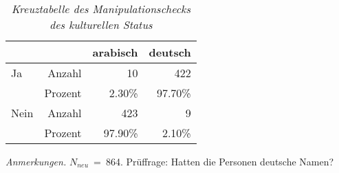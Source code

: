 \begin{table}[htb]
    \caption[Kreuztabelle Manipulationscheck kultureller Status]{\textit {Kreuztabelle des Manipulationschecks des kulturellen Status}} 
    \label{KT_kult}
    \centering
    \begin{adjustbox}{width=6.5cm} %
    \small
    \begin{tabular}{lrrr}
      \hline
        &   & arabisch & deutsch \\
      \hline
    Ja   & Anzahl  & 10      & 422      \\
         & Prozent & 2.30\%  & 97.70\%  \\
    Nein & Anzahl  & 423     & 9        \\
         & Prozent & 97.90\% & 2.10\%   \\
       \hline
    \end{tabular}
    \end{adjustbox}
    
    \begin{tablenotes}
        \item \textit{Anmerkungen.} \( N_{neu} \)~=~864. Prüffrage: Hatten die Personen deutsche Namen?
      \end{tablenotes}
    \end{table}